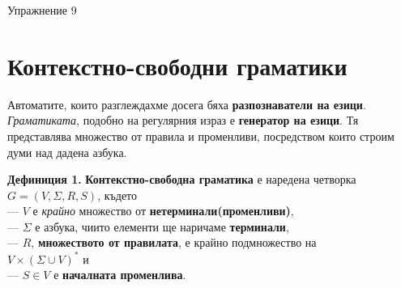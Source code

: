 \documentclass{article}
\begin{document}
\begin{center}
    {\huge Упражнение 9}
\end{center}

\vspace{15pt}

\section{Контекстно-свободни граматики}
    \hspace{15pt}Автоматите, които разглеждахме досега бяха \textbf{разпознаватели на езици}. 
    \textit{Граматиката}, подобно на регулярния израз е \textbf{генератор на езици}. 
    Тя представлява множество от правила и променливи, посредством които строим думи над дадена азбука. 

    \vspace{15pt}

    \textbf{Дефиниция 1.} \textbf{Контекстно-свободна граматика} е наредена четворка $G = (V,\Sigma,R,S)$, където \\
    — $V$ е \textit{крайно} множество от \textbf{нетерминали(променливи)}, \\
    — $\Sigma$ е азбука, чиито елементи ще наричаме \textbf{терминали}, \\
    — $R$, \textbf{множеството от правилата}, е крайно подмножество на \\ $V \times (\Sigma \cup V)^*$ и \\
    — $S \in V$ е \textbf{началната променлива}.

    \vspace{10pt}
\end{document}
